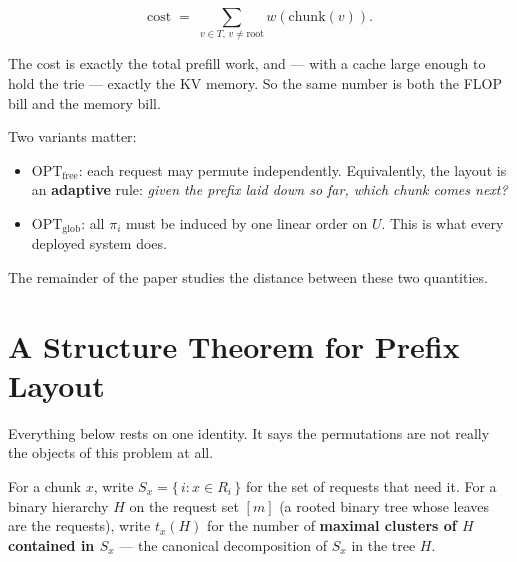 \documentclass[11pt]{article}
\theoremstyle{plain}
\begin{document}
\begin{equation}
\mathrm{cost} \;=\; \sum_{v \in T,\, v \neq \text{root}} w(\mathrm{chunk}(v)).
\end{equation}

The cost is exactly the total prefill work, and --- with a cache large enough to hold the trie --- exactly the KV memory. So the same number is both the FLOP bill and the memory bill.

Two variants matter:

\begin{itemize}
\item $\mathrm{OPT}_{\mathrm{free}}$: each request may permute independently. Equivalently, the layout is an \textbf{adaptive} rule: \emph{given the prefix laid down so far, which chunk comes next?}
\item $\mathrm{OPT}_{\mathrm{glob}}$: all $\pi_i$ must be induced by one linear order on $U$. This is what every deployed system does.
\end{itemize}

The remainder of the paper studies the distance between these two quantities.


\section{A Structure Theorem for Prefix Layout}

Everything below rests on one identity. It says the permutations are not really the objects of this problem at all.

For a chunk $x$, write $S_x = \{\, i : x \in R_i \,\}$ for the set of requests that need it. For a binary hierarchy $H$ on the request set $[m]$ (a rooted binary tree whose leaves are the requests), write $t_x(H)$ for the number of \textbf{maximal clusters of $H$ contained in $S_x$} --- the canonical decomposition of $S_x$ in the tree $H$.
\end{document}
